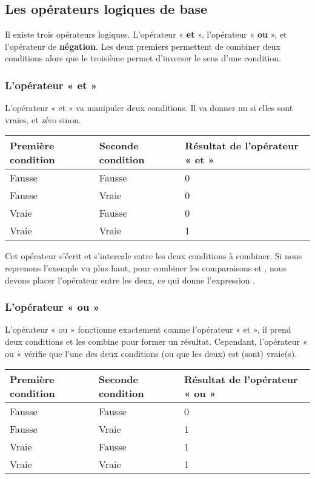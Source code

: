 \subsection{Les opérateurs logiques de base}
\label{les-operateurs-logiques-de-base}

Il existe trois opérateurs logiques. L'opérateur « \textbf{et} »,
l'opérateur « \textbf{ou} », et l'opérateur de \textbf{négation}. Les
deux premiers permettent de combiner deux conditions alors que le
troisième permet d'inverser le sens d'une condition.

\subsubsection{L'opérateur « et »}
\label{loperateur-et}

L'opérateur « et » va manipuler deux conditions. Il va donner un si
elles sont vraies, et zéro sinon.

\begin{table}[ht!]
\centering
\begin{tabular}{|l|l|l|}\hline
\rowcolor{gris-tab-entete}\textbf{Première condition} & \textbf{Seconde condition} & \textbf{Résultat de l'opérateur « et »}\tabularnewline\hline
Fausse & Fausse & 0\tabularnewline\hline
Fausse & Vraie & 0\tabularnewline\hline
Vraie & Fausse & 0\tabularnewline\hline
Vraie & Vraie & 1\tabularnewline\hline
\end{tabular}
\end{table}


Cet opérateur s'écrit \mybox{\&\&} et s'intercale entre les deux
conditions à combiner. Si nous reprenons l'exemple vu plus haut, pour
combiner les comparaisons  et
, nous devons placer l'opérateur
\mybox{\&\&} entre les deux, ce qui donne l'expression
.

\subsubsection{L'opérateur « ou »}
\label{loperateur-ou}

L'opérateur « ou » fonctionne exactement comme l'opérateur « et », il
prend deux conditions et les combine pour former un résultat. Cependant,
l'opérateur « ou » vérifie que l'une des deux conditions (ou que les
deux) est (sont) vraie(s).


\begin{table}[ht!]
\centering
\begin{tabular}{|l|l|l|}\hline
\rowcolor{gris-tab-entete}\textbf{Première condition} & \textbf{Seconde condition} & \textbf{Résultat de l'opérateur « ou »}\tabularnewline\hline
Fausse & Fausse & 0\tabularnewline\hline
Fausse & Vraie & 1\tabularnewline\hline
Vraie & Fausse & 1\tabularnewline\hline
Vraie & Vraie & 1\tabularnewline\hline
\end{tabular}
\end{table}

